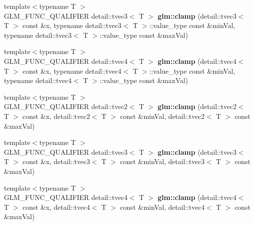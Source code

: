 \begin{DoxyCompactItemize}
\item 
\hypertarget{namespaceglm_a0cdcc0c9b89c686f79b390966be9457e}{}{\footnotesize template$<$typename T $>$ }\\G\+L\+M\+\_\+\+F\+U\+N\+C\+\_\+\+Q\+U\+A\+L\+I\+F\+I\+E\+R detail\+::tvec3$<$ T $>$ {\bfseries glm\+::clamp} (detail\+::tvec3$<$ T $>$ const \&x, typename detail\+::tvec3$<$ T $>$\+::value\+\_\+type const \&min\+Val, typename detail\+::tvec3$<$ T $>$\+::value\+\_\+type const \&max\+Val)\label{namespaceglm_a0cdcc0c9b89c686f79b390966be9457e}

\item 
\hypertarget{namespaceglm_aa132b5ea030fc61f5e542937502e9c88}{}{\footnotesize template$<$typename T $>$ }\\G\+L\+M\+\_\+\+F\+U\+N\+C\+\_\+\+Q\+U\+A\+L\+I\+F\+I\+E\+R detail\+::tvec4$<$ T $>$ {\bfseries glm\+::clamp} (detail\+::tvec4$<$ T $>$ const \&x, typename detail\+::tvec4$<$ T $>$\+::value\+\_\+type const \&min\+Val, typename detail\+::tvec4$<$ T $>$\+::value\+\_\+type const \&max\+Val)\label{namespaceglm_aa132b5ea030fc61f5e542937502e9c88}

\item 
\hypertarget{namespaceglm_a84f36f5b2d64937b9e5d6c7ea5a9af6c}{}{\footnotesize template$<$typename T $>$ }\\G\+L\+M\+\_\+\+F\+U\+N\+C\+\_\+\+Q\+U\+A\+L\+I\+F\+I\+E\+R detail\+::tvec2$<$ T $>$ {\bfseries glm\+::clamp} (detail\+::tvec2$<$ T $>$ const \&x, detail\+::tvec2$<$ T $>$ const \&min\+Val, detail\+::tvec2$<$ T $>$ const \&max\+Val)\label{namespaceglm_a84f36f5b2d64937b9e5d6c7ea5a9af6c}

\item 
\hypertarget{namespaceglm_ac1c86927b7c877d85620e44926fd663c}{}{\footnotesize template$<$typename T $>$ }\\G\+L\+M\+\_\+\+F\+U\+N\+C\+\_\+\+Q\+U\+A\+L\+I\+F\+I\+E\+R detail\+::tvec3$<$ T $>$ {\bfseries glm\+::clamp} (detail\+::tvec3$<$ T $>$ const \&x, detail\+::tvec3$<$ T $>$ const \&min\+Val, detail\+::tvec3$<$ T $>$ const \&max\+Val)\label{namespaceglm_ac1c86927b7c877d85620e44926fd663c}

\item 
\hypertarget{namespaceglm_af6385a855dccba450f5ed4090e592243}{}{\footnotesize template$<$typename T $>$ }\\G\+L\+M\+\_\+\+F\+U\+N\+C\+\_\+\+Q\+U\+A\+L\+I\+F\+I\+E\+R detail\+::tvec4$<$ T $>$ {\bfseries glm\+::clamp} (detail\+::tvec4$<$ T $>$ const \&x, detail\+::tvec4$<$ T $>$ const \&min\+Val, detail\+::tvec4$<$ T $>$ const \&max\+Val)\label{namespaceglm_af6385a855dccba450f5ed4090e592243}


\end{DoxyCompactItemize}
